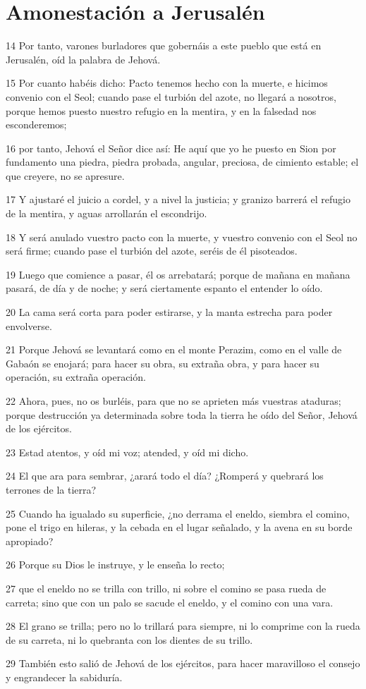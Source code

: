 \section*{Amonestación a Jerusalén}

\par 14 Por tanto, varones burladores que gobernáis a este pueblo que está en Jerusalén, oíd la palabra de Jehová.
\par 15 Por cuanto habéis dicho: Pacto tenemos hecho con la muerte, e hicimos convenio con el Seol; cuando pase el turbión del azote, no llegará a nosotros, porque hemos puesto nuestro refugio en la mentira, y en la falsedad nos esconderemos;
\par 16 por tanto, Jehová el Señor dice así: He aquí que yo he puesto en Sion por fundamento una piedra, piedra probada, angular, preciosa, de cimiento estable; el que creyere, no se apresure.
\par 17 Y ajustaré el juicio a cordel, y a nivel la justicia; y granizo barrerá el refugio de la mentira, y aguas arrollarán el escondrijo.
\par 18 Y será anulado vuestro pacto con la muerte, y vuestro convenio con el Seol no será firme; cuando pase el turbión del azote, seréis de él pisoteados.
\par 19 Luego que comience a pasar, él os arrebatará; porque de mañana en mañana pasará, de día y de noche; y será ciertamente espanto el entender lo oído.
\par 20 La cama será corta para poder estirarse, y la manta estrecha para poder envolverse.
\par 21 Porque Jehová se levantará como en el monte Perazim, como en el valle de Gabaón se enojará; para hacer su obra, su extraña obra, y para hacer su operación, su extraña operación.
\par 22 Ahora, pues, no os burléis, para que no se aprieten más vuestras ataduras; porque destrucción ya determinada sobre toda la tierra he oído del Señor, Jehová de los ejércitos.
\par 23 Estad atentos, y oíd mi voz; atended, y oíd mi dicho.
\par 24 El que ara para sembrar, ¿arará todo el día? ¿Romperá y quebrará los terrones de la tierra?
\par 25 Cuando ha igualado su superficie, ¿no derrama el eneldo, siembra el comino, pone el trigo en hileras, y la cebada en el lugar señalado, y la avena en su borde apropiado?
\par 26 Porque su Dios le instruye, y le enseña lo recto;
\par 27 que el eneldo no se trilla con trillo, ni sobre el comino se pasa rueda de carreta; sino que con un palo se sacude el eneldo, y el comino con una vara.
\par 28 El grano se trilla; pero no lo trillará para siempre, ni lo comprime con la rueda de su carreta, ni lo quebranta con los dientes de su trillo.
\par 29 También esto salió de Jehová de los ejércitos, para hacer maravilloso el consejo y engrandecer la sabiduría.

